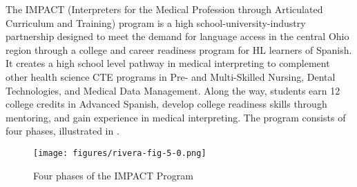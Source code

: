 \documentclass[output=paper]{langscibook}
\begin{document}
The IMPACT (Interpreters for the Medical Profession through Articulated Curriculum and Training) program is a high school-university-industry partnership designed to meet the demand for language access in the central Ohio region through a college and career readiness program for HL learners of Spanish. It creates a high school level pathway in medical interpreting to complement other health science CTE programs in Pre- and Multi-Skilled Nursing, Dental Technologies, and Medical Data Management. Along the way, students earn 12 college credits in Advanced Spanish, develop college readiness skills through mentoring, and gain experience in medical interpreting. The program consists of four phases, illustrated in .

\begin{figure}
\caption{\label{fig:5:1}Four phases of the IMPACT Program}
\texttt{[image: figures/rivera-fig-5-0.png]}
\end{figure}
\end{document}

